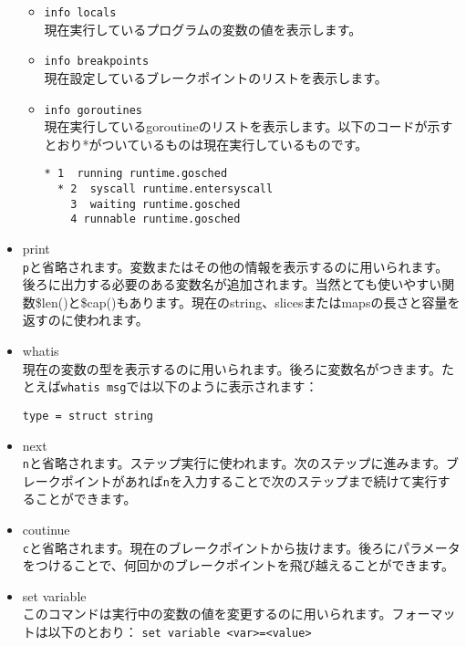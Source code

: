 \begin{itemize}
  \begin{itemize}
  \item \texttt{info locals}\\ 現在実行しているプログラムの変数の値を表示します。
  \item \texttt{info breakpoints}\\ 現在設定しているブレークポイントのリストを表示します。
  \item \texttt{info goroutines}\\現在実行しているgoroutineのリストを表示します。以下のコードが示すとおり*がついているものは現在実行しているものです。
\begin{lstlisting}[numbers=none]
  * 1  running runtime.gosched
  * 2  syscall runtime.entersyscall
    3  waiting runtime.gosched
    4 runnable runtime.gosched
\end{lstlisting}
\end{itemize}
\item print\\\texttt{p}と省略されます。変数またはその他の情報を表示するのに用いられます。後ろに出力する必要のある変数名が追加されます。当然とても使いやすい関数\$len()と\$cap()もあります。現在のstring、slicesまたはmapsの長さと容量を返すのに使われます。
\item whatis\\現在の変数の型を表示するのに用いられます。後ろに変数名がつきます。たとえば\texttt{whatis msg}では以下のように表示されます：
\begin{lstlisting}[numbers=none]
  type = struct string
\end{lstlisting}
\item next\\ \texttt{n}と省略されます。ステップ実行に使われます。次のステップに進みます。ブレークポイントがあれば\texttt{n}を入力することで次のステップまで続けて実行することができます。
\item coutinue\\ \texttt{c}と省略されます。現在のブレークポイントから抜けます。後ろにパラメータをつけることで、何回かのブレークポイントを飛び越えることができます。
\item set variable\\ このコマンドは実行中の変数の値を変更するのに用いられます。フォーマットは以下のとおり： \texttt{set variable <var>=<value>}
\end{itemize}

